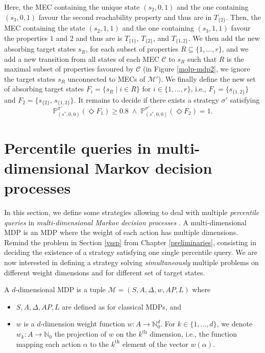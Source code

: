 \begin{example}
Here, the MEC containing the unique state $(s_2, 0, 1)$ and the one containing $(s_3, 0, 1)$ favour the second reachability property and thus are in $T_{\{2\}}$.
Then, the MEC containing the state $(s_2, 1, 1)$ and the one containing $(s_3, 1, 1)$ favour the properties $1$ and $2$ and thus are is $T_{\{1\}}$, $T_{\{2\}}$, and $T_{\{1, 2\}}$.
We then add the new absorbing target states $s_R$, for each subset of properties $R \subseteq \{1, \dots, r\}$, and we add a new transition from all states of each MEC $\mathcal{C}$ to $s_R$ such that $R$ is the maximal subset of properties favoured by $\mathcal{C}$ (in Figure \ref{molp-mdp2}, we ignore the target states $s_R$ unconnected to MECs of $\mathcal{M}'$).
We finally define the new set of absorbing target states $F_i = \{s_R \; | \; i \in R\}$ for $i \in \{1, \dots, r\}$, i.e., $F_1 = \{s_{\{1, 2\}}\}$ and $F_2 = \{s_{\{2\}}, \, s_{\{1, 2\}}\}$.
It remains to decide if there exists a strategy $\sigma'$ satisfying
\[
  \mathbb{P}^{\sigma'}_{(s^*, 0, 0)}(\Diamond F_1) \geq 0.8 \; \wedge \; \mathbb{P}_{(s^*, 0, 0)}^{\sigma'}(\Diamond F_2) = 1.
\]
\end{example}

\section{Percentile queries in multi-dimensional Markov decision processes}
In this section, we define some strategies allowing to deal with multiple \textit{percentile queries} in \textit{multi-dimensional Markov decision processes} \cite{DBLP:journals/fmsd/RandourRS17}.
A multi-dimensional MDP is an MDP where the weight of each action has multiple dimensions.
Remind the \SSPP{} problem in Section \ref{vssp} from Chapter \ref{preliminaries}, consisting in deciding the existence of a strategy satisfying one single percentile query.
We are now interested in defining a strategy solving \textit{simultaneously} multiple \SSPP{} problems on different weight dimensions and for different set of target states.

\begin{definition}
  A $d$-dimensional MDP is a tuple $\mathcal{M}=(S, A, \Delta, w, AP, L)$ where
  \begin{itemize}
    \item $S, A, \Delta, AP, L$ are defined as for classical MDPs, and
    \item $w$ is a $d$-dimension weight function $w: A \rightarrow \mathbb{N}_0^d$.
    For $k \in \{1, \dots, d\}$, we denote $w_k:A\rightarrow\mathbb{N}_0$ the projection of $w$ on the $k^\text{th}$ dimension, i.e., the function mapping each action $\alpha$ to the $k^\text{th}$ element of the vector $w(\alpha)$.
  \end{itemize}
\end{definition}

